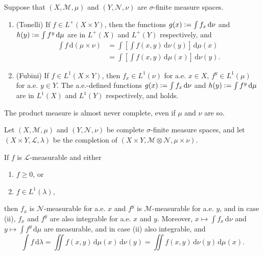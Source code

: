 \documentclass[12pt]{article}	%
\begin{document}
\begin{thm}
	Suppose that $(X, \mathcal{M}, \mu)$ and $(Y, \mathcal{N}, \nu)$ are $\sigma$-finite measure spaces.
	\begin{enumerate}
		\item (Tonelli) If $f \in L^{+}(X \times Y)$, then the functions $g(x) \vcentcolon= \int f_{x} \,{\mathrm d}\nu$ and $h(y) \vcentcolon= \int f^{y} \,{\mathrm d}\mu$ are in $L^{+}(X)$ and $L^{+}(Y)$ respectively, and
		\begin{equation} \label{eq:001}
			\begin{aligned}
				\int f \,{\mathrm{d}}(\mu \times \nu) &= \int \left[\int f(x, y) \,{\mathrm{d}}\nu(y)\right] \,{\mathrm{d}}\mu(x) \\
				&= \int \left[\int f(x, y) \,{\mathrm{d}}\mu(x)\right] \,{\mathrm{d}}\nu(y).
			\end{aligned}
		\end{equation}
		\item (Fubini) If $f \in L^{1}(X \times Y)$, then $f_{x} \in L^{1}(\nu)$ for a.e. $x \in X$, $f^{y} \in L^{1}(\mu)$ for a.e. $y \in Y$. The a.e.-defined functions $g(x) \vcentcolon= \int f_{x} \,{\mathrm d}\nu$ and $h(y) \vcentcolon= \int f^{y} \,{\mathrm d}\mu$ are in $L^{1}(X)$ and $L^{1}(Y)$ respectively, and  holds.
	\end{enumerate}
\end{thm}

The product measure is almost never complete, even if $\mu$ and $\nu$ are so.

\begin{thm}
	Let $(X, \mathcal{M}, \mu)$ and $(Y, \mathcal{N}, \nu)$ be complete $\sigma$-finite measure spaces, and let $(X \times Y, \mathcal{L}, \lambda)$ be the completion of $(X \times Y, \mathcal{M} \otimes \mathcal{N}, \mu \times \nu)$. 

	If $f$ is $\mathcal{L}$-measurable and either
	\begin{enumerate}[label=(\roman*)]
		\item $f \ge 0$, or 
		\item $f \in L^{1}(\lambda)$,
	\end{enumerate}
	then $f_{x}$ is $\mathcal{N}$-measurable for a.e. $x$ and $f^{y}$ is $\mathcal{M}$-measurable for a.e. $y$, and in case (ii), $f_{x}$ and $f^{y}$ are also integrable for a.e. $x$ and $y$. Moreover, $x \mapsto \int f_{x} \,{\mathrm d}\nu$ and $y \mapsto \int f^{y} \,{\mathrm d}\mu$ are measurable, and in case (ii) also integrable, and
	\begin{equation*} 
		\int f \,{\mathrm d}\lambda = \iint f(x, y) \,{\mathrm d}\mu(x)\,{\mathrm d}\nu(y) = \iint f(x, y) \,{\mathrm d}\nu(y)\,{\mathrm d}\mu(x).
	\end{equation*}
\end{thm}
\end{document}
